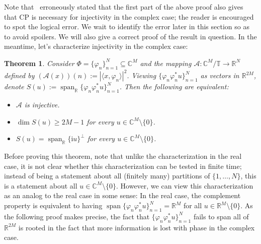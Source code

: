 \documentclass[times,10pt]{elsarticle}
\theoremstyle{plain}
\newtheorem{theorem}{Theorem}
\begin{document}
Note that~\cite{BalanCE:06} erroneously stated that the first part of the above proof also gives that CP is necessary for injectivity in the complex case; the reader is encouraged to spot the logical error.
We wait to identify the error later in this section so as to avoid spoilers.
We will also give a correct proof of the result in question.
In the meantime, let's characterize injectivity in the complex case:

\begin{theorem}
\label{thm.complex injective}
Consider $\Phi=\{\varphi_n\}_{n=1}^N\subseteq\mathbb{C}^M$ and the mapping $\mathcal{A}\colon\mathbb{C}^M/\mathbb{T}\rightarrow\mathbb{R}^N$ defined by $(\mathcal{A}(x))(n):=|\langle x,\varphi_n\rangle|^2$.
Viewing $\{\varphi_n\varphi_n^* u\}_{n=1}^N$ as vectors in $\mathbb{R}^{2M}$, denote $S(u):=\operatorname{span}_\mathbb{R}\{\varphi_n\varphi_n^* u\}_{n=1}^N$.
Then the following are equivalent:
\begin{itemize}
\item[(a)] $\mathcal{A}$ is injective.
\item[(b)] $\operatorname{dim}S(u)\geq 2M-1$ for every $u\in\mathbb{C}^M\setminus\{0\}$.
\item[(c)] $S(u)=\operatorname{span}_\mathbb{R}\{\mathrm{i}u\}^\perp$ for every $u\in\mathbb{C}^M\setminus\{0\}$.
\end{itemize}
\end{theorem}

Before proving this theorem, note that unlike the characterization in the real case, it is not clear whether this characterization can be tested in finite time; instead of being a statement about all (finitely many) partitions of $\{1,\ldots,N\}$, this is a statement about all $u\in\mathbb{C}^M\setminus\{0\}$.
However, we can view this characterization as an analog to the real case in some sense:
In the real case, the complement property is equivalent to having $\operatorname{span}\{\varphi_n\varphi_n^* u\}_{n=1}^N=\mathbb{R}^M$ for all $u\in\mathbb{R}^M\setminus\{0\}$.
As the following proof makes precise, the fact that $\{\varphi_n\varphi_n^* u\}_{n=1}^N$ fails to span all of $\mathbb{R}^{2M}$ is rooted in the fact that more information is lost with phase in the complex case.
\end{document}
